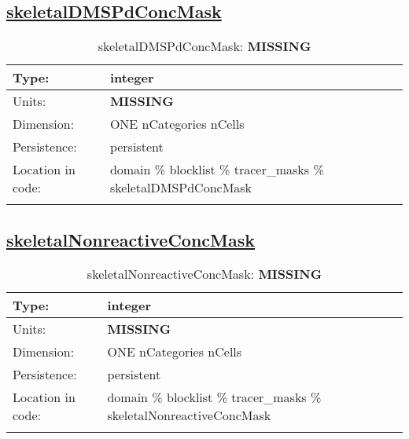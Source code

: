 \subsection[skeletalDMSPdConcMask]{\hyperref[sec:var_tab_tracer_masks]{skeletalDMSPdConcMask}}
\label{subsec:var_sec_tracer_masks_skeletalDMSPdConcMask}
\begin{center}
\begin{longtable}{| p{2.0in} | p{4.0in} |}
        \hline 
        Type: & integer \\
        \hline 
        Units: & {\bf \color{red} MISSING} \\
        \hline 
        Dimension: & ONE nCategories nCells \\
        \hline 
        Persistence: & persistent \\
        \hline 
         Location in code: & domain \% blocklist \% tracer\_masks \% skeletalDMSPdConcMask \\
         \hline 
    \caption{skeletalDMSPdConcMask: {\bf \color{red} MISSING}}
\end{longtable}
\end{center}
\subsection[skeletalNonreactiveConcMask]{\hyperref[sec:var_tab_tracer_masks]{skeletalNonreactiveConcMask}}
\label{subsec:var_sec_tracer_masks_skeletalNonreactiveConcMask}
\begin{center}
\begin{longtable}{| p{2.0in} | p{4.0in} |}
        \hline 
        Type: & integer \\
        \hline 
        Units: & {\bf \color{red} MISSING} \\
        \hline 
        Dimension: & ONE nCategories nCells \\
        \hline 
        Persistence: & persistent \\
        \hline 
         Location in code: & domain \% blocklist \% tracer\_masks \% skeletalNonreactiveConcMask \\
         \hline 
    \caption{skeletalNonreactiveConcMask: {\bf \color{red} MISSING}}
\end{longtable}
\end{center}

